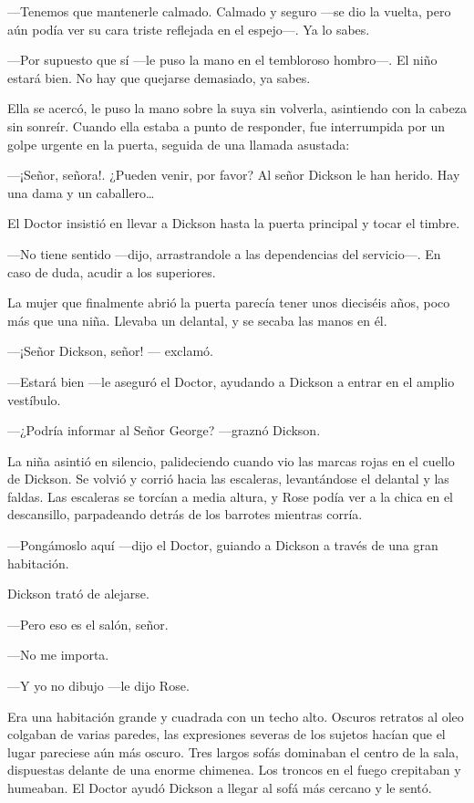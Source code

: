 {---Tenemos que mantenerle calmado. Calmado y seguro ---se dio la
vuelta, pero aún podía ver su cara triste reflejada en el espejo---. Ya
lo sabes.}

{---Por supuesto que sí ---le puso la mano en el tembloroso hombro---.
El niño estará bien. No hay que quejarse demasiado, ya sabes.}

{Ella se acercó, le puso la mano sobre la suya sin volverla, asintiendo
con la cabeza sin sonreír. Cuando ella estaba a punto de responder, fue
interrumpida por un golpe urgente en la puerta, seguida de una llamada
asustada:}

{---¡Señor, señora!. ¿Pueden venir, por favor? Al señor Dickson le han
herido. Hay una dama y un caballero\ldots{}}

{El Doctor insistió en llevar a Dickson hasta la puerta principal y
tocar el timbre.}

{---No tiene sentido ---dijo, arrastrandole a las dependencias del
servicio---. En caso de duda, acudir a los superiores.}

{La mujer que finalmente abrió la puerta parecía tener unos dieciséis
años, poco más que una niña. Llevaba un delantal, y se secaba las manos
en él.}

{---¡Señor Dickson, señor! --- exclamó.}

{---Estará bien ---le aseguró el Doctor, ayudando a Dickson a entrar en
el amplio vestíbulo.}

{---¿Podría informar al Señor George? ---graznó Dickson.}

{La niña asintió en silencio, palideciendo cuando vio las marcas rojas
en el cuello de Dickson. Se volvió y corrió hacia las escaleras,
levantándose el delantal y las faldas. Las escaleras se torcían a media
altura, y Rose podía ver a la chica en el descansillo, parpadeando
detrás de los barrotes mientras corría.}

{---Pongámoslo aquí ---dijo el Doctor, guiando a Dickson a través de una
gran habitación.}

{Dickson trató de alejarse.}

{---Pero eso es el salón, señor.}

{---No me importa.}

{---Y yo no dibujo ---le dijo Rose.}

{Era una habitación grande y cuadrada con un techo alto. Oscuros
retratos al oleo colgaban de varias paredes, las expresiones severas de
los sujetos hacían que el lugar pareciese aún más oscuro. Tres largos
sofás dominaban el centro de la sala, dispuestas delante de una enorme
chimenea. Los troncos en el fuego crepitaban y humeaban. El Doctor ayudó
Dickson a llegar al sofá más cercano y le sentó.}

